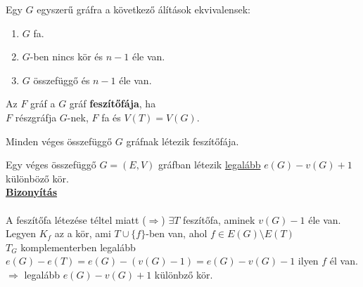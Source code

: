 \documentclass{beamer}
\newcommand{\msmallskip}{\vspace{0.3em}}
\newcommand{\mmedskip}{\vspace{0.5em}}
\begin{document}
\begin{frame} 
\begin{tcolorbox}[title={Tétel: Ekvivalens állítások n-pontú fákra}]
Egy $G$ egyszerű gráfra a következő álítások ekvivalensek:
\begin{enumerate}
\item $G$ fa.
\item $G$-ben nincs kör és $n - 1$ éle van.
\item $G$ összefüggő és $n - 1$ éle van.
\end{enumerate}
\end{tcolorbox}

\begin{tcolorbox}[title={Def.: Feszítőfa}]
Az $F$ gráf a $G$ gráf \textbf{feszítőfája}, ha\\
$F$ részgráfja $G$-nek, $F$ fa és $V(T) = V(G)$.
\end{tcolorbox}

\begin{tcolorbox}[title={Tétel: Feszítőfa létezése}]
Minden véges összefüggő $G$ gráfnak létezik feszítőfája.
\end{tcolorbox}

\end{frame}

\begin{frame} 
\begin{tcolorbox}[title={Tétel: Körök száma}]
Egy véges összefüggő $G = (E, V)$ gráfban létezik \underline{legalább} $e(G) - v(G) + 1$ különböző kör.\\
\tcblower
\msmallskip
\underline{\textbf{Bizonyítás}}\\
\mmedskip
\\
A feszítőfa létezése téltel miatt ($\Rightarrow$) $\exists T$ feszítőfa, aminek $v(G) - 1$ éle van.\\
Legyen $K_f$ az a kör, ami $T \cup \{f\}$-ben van, ahol $f \in E(G) \setminus E(T)$\\
$T_G$ komplementerben legalább $e(G) - e(T) = e(G) - (v(G) - 1) = e(G) - v(G) - 1$ ilyen $f$ él van.\\
$\Rightarrow$ legalább $e(G) - v(G) + 1$ különbző kör.
\end{tcolorbox}
\end{frame}
\end{document}
